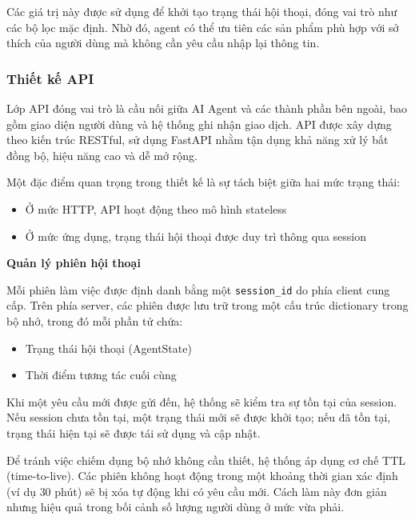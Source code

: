 Các giá trị này được sử dụng để khởi tạo trạng thái hội thoại, đóng vai trò như các bộ lọc mặc định. Nhờ đó, agent có thể ưu tiên các sản phẩm phù hợp với sở thích của người dùng mà không cần yêu cầu nhập lại thông tin.










\subsubsection{Thiết kế API}

Lớp API đóng vai trò là cầu nối giữa AI Agent và các thành phần bên ngoài, bao gồm giao diện người dùng và hệ thống ghi nhận giao dịch. API được xây dựng theo kiến trúc RESTful, sử dụng FastAPI nhằm tận dụng khả năng xử lý bất đồng bộ, hiệu năng cao và dễ mở rộng.

Một đặc điểm quan trọng trong thiết kế là sự tách biệt giữa hai mức trạng thái:

\begin{itemize}
\item Ở mức HTTP, API hoạt động theo mô hình stateless
\item Ở mức ứng dụng, trạng thái hội thoại được duy trì thông qua session
\end{itemize}

\textbf{Quản lý phiên hội thoại}

Mỗi phiên làm việc được định danh bằng một \texttt{session\_id} do phía client cung cấp. Trên phía server, các phiên được lưu trữ trong một cấu trúc dictionary trong bộ nhớ, trong đó mỗi phần tử chứa:

\begin{itemize}
\item Trạng thái hội thoại (AgentState)
\item Thời điểm tương tác cuối cùng
\end{itemize}

Khi một yêu cầu mới được gửi đến, hệ thống sẽ kiểm tra sự tồn tại của session. Nếu session chưa tồn tại, một trạng thái mới sẽ được khởi tạo; nếu đã tồn tại, trạng thái hiện tại sẽ được tái sử dụng và cập nhật.

Để tránh việc chiếm dụng bộ nhớ không cần thiết, hệ thống áp dụng cơ chế TTL (time-to-live). Các phiên không hoạt động trong một khoảng thời gian xác định (ví dụ $30$ phút) sẽ bị xóa tự động khi có yêu cầu mới. Cách làm này đơn giản nhưng hiệu quả trong bối cảnh số lượng người dùng ở mức vừa phải.


